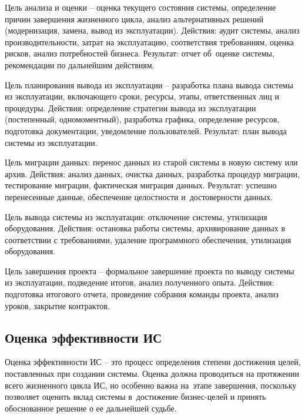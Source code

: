 \documentclass{ou}
\begin{document}
Цель анализа и оценки -- оценка текущего состояния системы, определение причин завершения жизненного цикла, анализ альтернативных решений (модернизация, замена, вывод из эксплуатации). Действия: аудит системы, анализ производительности, затрат на эксплуатацию, соответствия требованиям, оценка рисков, анализ потребностей бизнеса. Результат: отчет об~оценке системы, рекомендации по дальнейшим действиям.

Цель планирования вывода из эксплуатации -- разработка плана вывода системы из эксплуатации, включающего сроки, ресурсы, этапы, ответственных лиц и процедуры. Действия: определение стратегии вывода из эксплуатации (постепенный, одномоментный), разработка графика, определение ресурсов, подготовка документации, уведомление пользователей. Результат: план вывода системы из эксплуатации.

Цель миграции данных: перенос данных из старой системы в новую систему или архив. Действия: анализ данных, очистка данных, разработка процедур миграции, тестирование миграции, фактическая миграция данных. Результат: успешно перенесенные данные, обеспечение целостности и~достоверности данных.

Цель вывода системы из эксплуатации: отключение системы, утилизация оборудования. Действия: остановка работы системы, архивирование данных в соответствии с требованиями, удаление программного обеспечения, утилизация оборудования.

Цель завершения проекта -- формальное завершение проекта по выводу системы из эксплуатации, подведение итогов, анализ полученного опыта. Действия: подготовка итогового отчета, проведение собрания команды проекта, анализ уроков, закрытие контрактов.
\subsection{Оценка эффективности ИС}
Оценка эффективности ИС -- это процесс определения степени достижения целей, поставленных при создании системы. Оценка должна проводиться на протяжении всего жизненного цикла ИС, но особенно важна на~этапе завершения, поскольку позволяет оценить вклад системы в~достижение бизнес-целей и принять обоснованное решение о ее дальнейшей судьбе.
\end{document}
